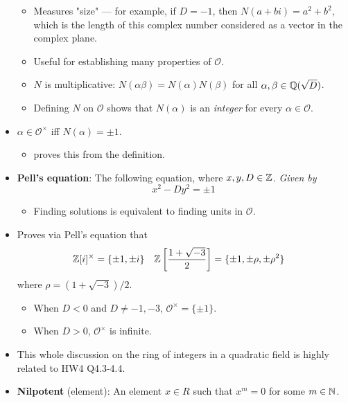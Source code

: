\documentclass[../notes.tex]{subfiles}
\begin{document}
\begin{itemize}
\begin{itemize}
        \item Measures "size" --- for example, if $D=-1$, then $N(a+bi)=a^2+b^2$, which is the length of this complex number considered as a vector in the complex plane.
        \item Useful for establishing many properties of $\mathcal{O}$.
        \item $N$ is multiplicative: $N(\alpha\beta)=N(\alpha)N(\beta)$ for all $\alpha,\beta\in\mathbb{Q}(\sqrt{D})$.
        \item Defining $N$ on $\mathcal{O}$ shows that $N(\alpha)$ is an \emph{integer} for every $\alpha\in\mathcal{O}$.
    \end{itemize}
    \item $\alpha\in\mathcal{O}^\times$ iff $N(\alpha)=\pm 1$.
    \begin{itemize}
        \item \textcite{bib:DummitFoote} proves this from the definition.
    \end{itemize}
    \item \textbf{Pell's equation}: The following equation, where $x,y,D\in\mathbb{Z}$. \emph{Given by}
    \begin{equation*}
        x^2-Dy^2 = \pm 1
    \end{equation*}
    \begin{itemize}
        \item Finding solutions is equivalent to finding units in $\mathcal{O}$.
    \end{itemize}
    \item Proves via Pell's equation that
    \begin{align*}
        \mathbb{Z}[i]^\times &= \{\pm 1,\pm i\}&
        \mathbb{Z}\left[ \frac{1+\sqrt{-3}}{2} \right] &= \{\pm 1,\pm\rho,\pm\rho^2\}
    \end{align*}
    where $\rho=(1+\sqrt{-3})/2$.
    \begin{itemize}
        \item When $D<0$ and $D\neq -1,-3$, $\mathcal{O}^\times=\{\pm 1\}$.
        \item When $D>0$, $\mathcal{O}^\times$ is infinite.
    \end{itemize}
    \item This whole discussion on the ring of integers in a quadratic field is highly related to HW4 Q4.3-4.4.
    \item \textbf{Nilpotent} (element): An element $x\in R$ such that $x^m=0$ for some $m\in\mathbb{N}$.
\end{itemize}
\end{document}
